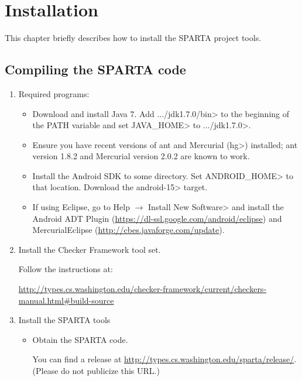\htmlhr
\chapter{Installation\label{installation}}

This chapter briefly describes how to install the SPARTA project tools.

\section{Compiling the SPARTA code}

\begin{enumerate}

\item Required programs:

\begin{itemize}
\item Download and install Java 7. Add \<.../jdk1.7.0/bin> to the
  beginning of the PATH variable and set \<JAVA\_HOME> to
  \<.../jdk1.7.0>.

\item Ensure you have recent versions of ant and Mercurial (\<hg>) installed;
  ant version 1.8.2 and Mercurial version 2.0.2 are known to work.

\item Install the Android SDK to some directory. Set \<ANDROID\_HOME> to that
  location.
  Download the \<android-15> target.

\item If using Eclipse, go to
\<Help $\rightarrow$ Install New Software>
and install the Android ADT Plugin (\url{https://dl-ssl.google.com/android/eclipse}) and MercurialEclipse (\url{http://cbes.javaforge.com/update}).

\end{itemize}


\item Install the Checker Framework tool set.

Follow the instructions at:

\url{http://types.cs.washington.edu/checker-framework/current/checkers-manual.html#build-source}


\item
Install the SPARTA tools

\begin{itemize}
\item
 Obtain the SPARTA code.

 You can find a release at
 \url{http://types.cs.washington.edu/sparta/release/}.  (Please do not
 publicize this URL.)


\end{itemize}
\end{enumerate}

